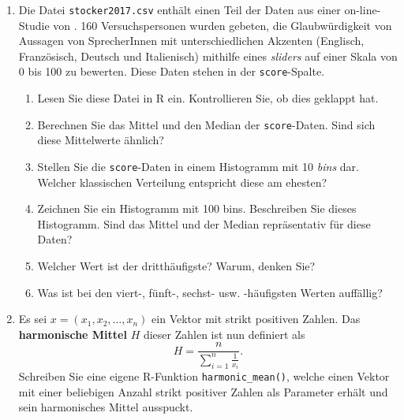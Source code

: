 \documentclass[oneside, 10pt]{book}\usepackage[]{graphicx}\usepackage[]{xcolor}
\begin{document}
\begin{enumerate}
  \item Die Datei \texttt{stocker2017.csv} enthält einen Teil der Daten aus einer
  on-line-Studie von \citet{Stocker2017}.
  160 Versuchspersonen wurden gebeten, die Glaubwürdigkeit von Aussagen von
  SprecherInnen mit unterschiedlichen Akzenten (Englisch, Französisch, Deutsch und Italienisch)
  mithilfe eines \textit{sliders} auf einer Skala von 0 bis 100 zu bewerten.
  Diese Daten stehen in der \texttt{score}-Spalte.\label{ex:stocker}

    \begin{enumerate}
      \item Lesen Sie diese Datei in R ein. Kontrollieren Sie, ob dies geklappt hat.

      \item Berechnen Sie das Mittel und den Median der \texttt{score}-Daten.
      Sind sich diese Mittelwerte ähnlich?

      \item Stellen Sie die \texttt{score}-Daten in einem Histogramm mit 10 \textit{bins} dar.
      Welcher klassischen Verteilung entspricht diese am ehesten?

      \item Zeichnen Sie ein Histogramm mit 100 bins.
      Beschreiben Sie dieses Histogramm.
      Sind das Mittel und der Median repräsentativ für diese Daten?

      \item Welcher Wert ist der dritthäufigste? Warum, denken Sie?

      \item Was ist bei den viert-, fünft-, sechst- usw. -häufigsten Werten auffällig?
    \end{enumerate}
    
    \item Es sei $x = (x_1, x_2, \dots, x_n)$ ein Vektor
    mit strikt positiven Zahlen. Das \textbf{harmonische Mittel}
    $H$ dieser Zahlen ist nun definiert als
    \[
      H = \frac{n}{\sum_{i=1}^n \frac{1}{x_i}}.
    \]
    Schreiben Sie eine eigene R-Funktion \texttt{harmonic\_mean()},
    welche einen Vektor mit einer beliebigen Anzahl strikt positiver
    Zahlen als Parameter erhält und sein harmonisches Mittel ausspuckt.


\end{enumerate}
\end{document}
